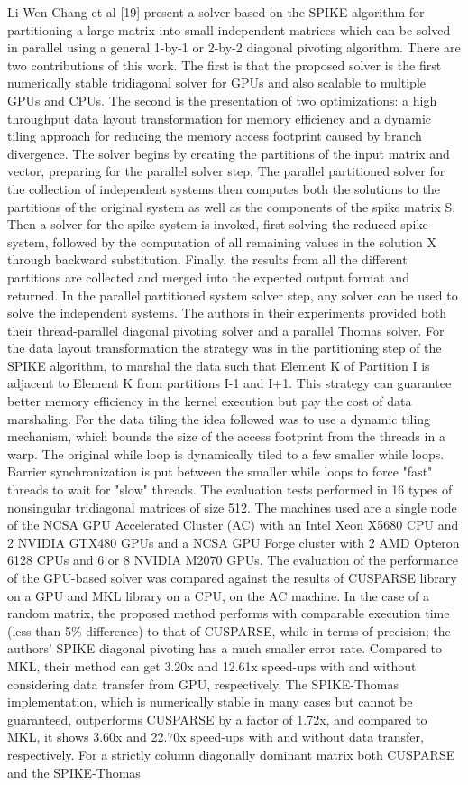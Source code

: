 Li-Wen Chang et al [19] present a solver based on the SPIKE algorithm for partitioning a large matrix into small independent matrices which can be solved in parallel using a general 1-by-1 or 2-by-2 diagonal pivoting algorithm. There are two contributions of this work. The first is that the proposed solver is the first numerically stable tridiagonal solver for GPUs and also scalable to multiple GPUs and CPUs. The second is the presentation of two optimizations: a high throughput data layout transformation for memory efficiency and a dynamic tiling approach for reducing the memory access footprint caused by branch divergence. The solver begins by creating the partitions of the input matrix and vector, preparing for the parallel solver step. The parallel partitioned solver for the collection of independent systems then computes both the solutions to the partitions of the original system as well as the components of the spike matrix S.  Then a solver for the spike system is invoked, first solving the reduced spike system, followed by the computation of all remaining values in the solution X through backward substitution. Finally, the results from all the different partitions are collected and merged into the expected output format and returned. In the parallel partitioned system solver step, any solver can be used to solve the independent systems. The authors in their experiments provided both their thread-parallel diagonal pivoting solver and a parallel Thomas solver. For the data layout transformation the strategy was in the partitioning step of the SPIKE algorithm, to marshal the data such that Element K of Partition I is adjacent to Element K from partitions I-1 and I+1. This strategy can guarantee better memory efficiency in the kernel execution but pay the cost of data marshaling. For the data tiling the idea followed was to use a dynamic tiling mechanism, which bounds the size of the access footprint from the threads in a warp. The original while loop is dynamically tiled to a few smaller while loops. Barrier synchronization is put between the smaller while loops to force "fast" threads to wait for "slow" threads. The evaluation tests performed in 16 types of nonsingular tridiagonal matrices of size 512. The machines used are a single node of the NCSA GPU Accelerated Cluster (AC) with an Intel Xeon X5680 CPU and 2 NVIDIA GTX480 GPUs and a NCSA GPU Forge cluster with 2 AMD Opteron 6128 CPUs and 6 or 8 NVIDIA M2070 GPUs. The evaluation of the performance of the GPU-based solver was compared against the results of CUSPARSE library on a GPU and MKL library on a CPU, on the AC machine. In the case of a random matrix, the proposed method performs with comparable execution time (less than 5\% difference) to that of CUSPARSE, while in terms of precision; the authors’ SPIKE diagonal pivoting has a much smaller error rate. Compared to MKL, their method can get 3.20x and 12.61x speed-ups with and without considering data transfer from GPU, respectively. The SPIKE-Thomas implementation, which is numerically stable in many cases but cannot be guaranteed, outperforms CUSPARSE by a factor of 1.72x, and compared to MKL, it shows 3.60x and 22.70x speed-ups with and without data transfer, respectively. For a strictly column diagonally dominant matrix both CUSPARSE and the SPIKE-Thomas 